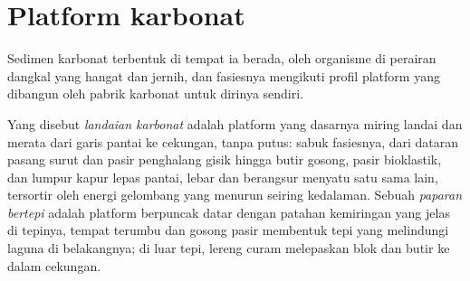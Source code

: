 \section{Platform karbonat}\label{sec:b3:facies-models:carbonates}

Sedimen karbonat terbentuk di tempat ia berada, oleh organisme di perairan dangkal yang hangat dan jernih,
dan fasiesnya mengikuti profil platform yang
dibangun oleh pabrik karbonat untuk dirinya sendiri.

\begin{definition}\label{def:b3:facies-models:ramp}
Yang disebut \emph{landaian karbonat} adalah platform yang dasarnya
miring landai dan merata dari garis pantai ke cekungan, tanpa putus:
sabuk fasiesnya, dari dataran pasang surut dan pasir penghalang gisik hingga butir gosong,
pasir bioklastik, dan lumpur kapur lepas pantai, lebar dan berangsur menyatu satu sama lain,
tersortir oleh energi gelombang yang menurun seiring kedalaman. Sebuah \emph{paparan
bertepi} adalah platform berpuncak datar dengan patahan kemiringan yang jelas di
tepinya, tempat terumbu dan gosong pasir membentuk tepi yang melindungi
laguna di belakangnya; di luar tepi, lereng curam melepaskan blok dan butir ke dalam
cekungan.
\end{definition}

